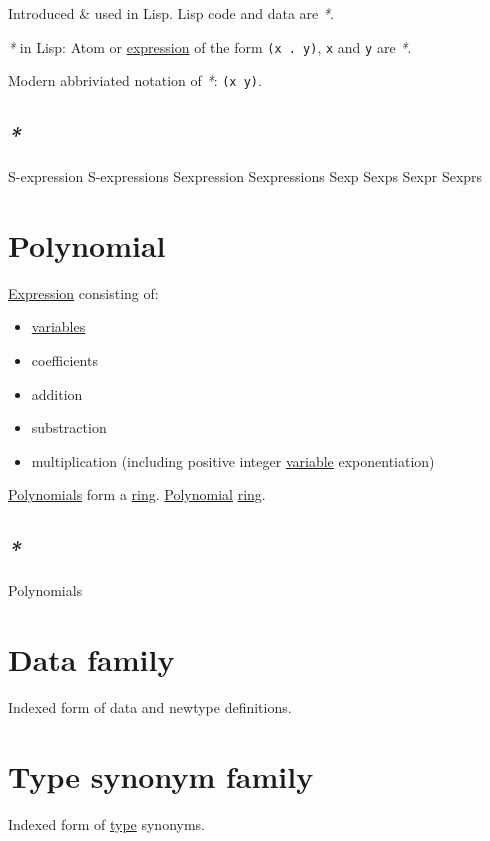 \documentclass[a4paper,14pt,oneside]{book}
\begin{document}
Introduced \& used in Lisp. Lisp code and data are \emph{*}.

\emph{*} in Lisp: Atom or \hyperref[orgbe3746b]{expression} of the form \texttt{(x . y)}, \texttt{x} and \texttt{y} are \emph{*}.

Modern abbriviated notation of \emph{*}: \texttt{(x y)}.

\section{\emph{*}}
\label{sec:orgffc74c8}

\label{org26324d1}S-expression
\label{org4ef6fac}S-expressions
\label{orgdad29c3}Sexpression
\label{orga0e400e}Sexpressions
\label{org111e91a}Sexp
\label{org4de6514}Sexps
\label{org05678fe}Sexpr
\label{org0bfb98b}Sexprs

\chapter{\label{org6cb9b07}Polynomial}
\label{sec:orgccac7d6}
\hyperref[orgbe3746b]{Expression} consisting of:
\begin{itemize}
\item \hyperref[org70949da]{variables}
\item coefficients
\item addition
\item substraction
\item multiplication (including positive integer \hyperref[orgfd9dbe7]{variable} exponentiation)
\end{itemize}

\hyperref[org3220d5c]{Polynomials} form a \hyperref[orgd8b1f5c]{ring}. \hyperref[org6cb9b07]{Polynomial} \hyperref[orgd8b1f5c]{ring}.

\section{\emph{*}}
\label{sec:org932978b}

\label{org3220d5c}Polynomials

\chapter{\label{org8793404}Data family}
\label{sec:orgc0748cd}
Indexed form of data and newtype definitions.

\chapter{\label{orgf01e702}Type synonym family}
\label{sec:orge51ef83}
Indexed form of \hyperref[orgaa4a18b]{type} synonyms.
\end{document}
